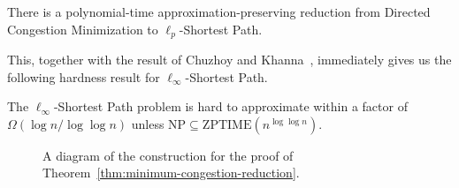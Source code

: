 \documentclass[11pt,a4paper]{article}
\begin{document}
\begin{theorem}\label{thm:minimum-congestion-reduction}
There is a polynomial-time approximation-preserving reduction from Directed Congestion Minimization to $\ell_p$-Shortest Path.
\end{theorem}
This, together with the result of Chuzhoy and Khanna~\cite{chuzhoy2006hardness}, immediately gives us the following hardness result for $\ell_\infty$-Shortest Path.
\begin{corollary}
    The $\ell_\infty$-Shortest Path problem is hard to approximate within a factor of $\Omega(\log n/ \log \log n)$ unless $\mathrm{NP} \subseteq \mathrm{ZPTIME}(n^{\log \log n})$.
\end{corollary}
  \begin{figure}[t]
        \centering
        
        \caption{A diagram of the construction for the proof of Theorem~\ref{thm:minimum-congestion-reduction}.}
        \label{fig:minimum-congestion-reduction}
    \end{figure}
\end{document}
